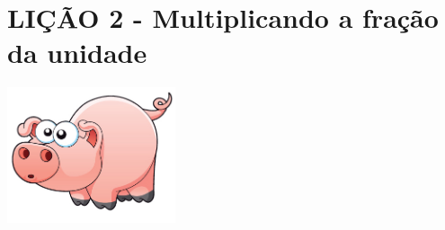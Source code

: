 \documentclass[a4,12pt]{book}
\begin{document}
\section*{ LIÇÃO 2 - Multiplicando a fração da unidade }







\includegraphics[width=\textwidth,height=4cm, keepaspectratio]{pig}
\end{document}
